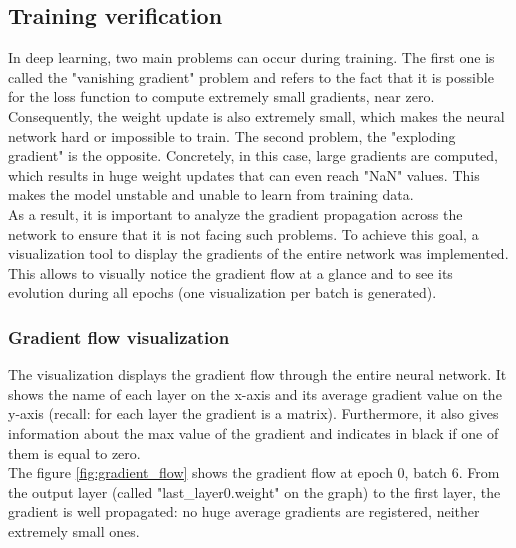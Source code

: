 \subsection{Training verification}
In deep learning, two main problems can occur during training. The first one is called the "vanishing gradient" problem and refers to the fact that it is possible for the loss function to compute extremely small gradients, near zero. Consequently, the weight update is also extremely small, which makes the neural network hard or impossible to train. The second problem, the "exploding gradient" is the opposite. Concretely, in this case, large gradients are computed, which results in huge weight updates that can even reach "NaN" values. This makes the model unstable and unable to learn from training data.  \\
As a result, it is important to analyze the gradient propagation across the network to ensure that it is not facing such problems. To achieve this goal, a visualization tool to display the gradients of the entire network was implemented. This allows to visually notice the gradient flow at a glance and to see its evolution during all epochs (one visualization per batch is generated).


\subsubsection{Gradient flow visualization}
The visualization displays the gradient flow through the entire neural network. It shows the name of each layer on the x-axis and its average gradient value on the y-axis (recall: for each layer the gradient is a matrix). Furthermore, it also gives information about the max value of the gradient and indicates in black if one of them is equal to zero.\\
The figure \ref{fig:gradient_flow} shows the gradient flow at epoch 0, batch 6. From the output layer (called "last\_layer0.weight" on the graph) to the first layer, the gradient is well propagated: no huge average gradients are registered, neither extremely small ones.


